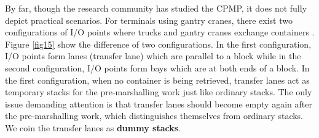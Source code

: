 \documentclass[review,3p,times,authoryear,12pt]{elsarticle}
\begin{document}
By far, though the research community has studied the CPMP, it does not fully depict practical scenarios. For terminals using gantry cranes, there exist two configurations of I/O points where trucks and gantry cranes exchange containers \cite{Carlo2014}. Figure \ref{fig15} show the difference of two configurations. In the first configuration, I/O points form lanes (transfer lane) which are parallel to a block while in the second configuration, I/O points form bays which are at both ends of a block. In the first configuration, when no container is being retrieved, transfer lanes act as temporary stacks for the pre-marshalling work just like ordinary stacks. The only issue demanding attention is that transfer lanes should become empty again after the pre-marshalling work, which distinguishes themselves from ordinary stacks. We coin the transfer lanes as \textbf{dummy stacks}.
\end{document}
